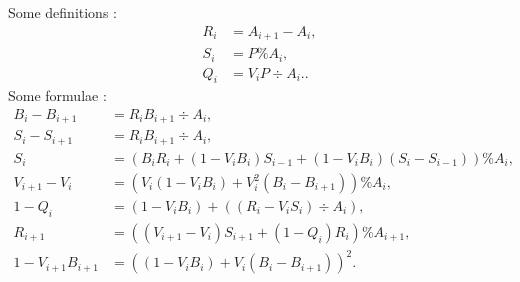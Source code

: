 \documentclass{sig-alternate-2013}
\begin{document}
\begin{lem} \label{lem:formulae}
Some definitions :
\begin{align}
R_i &= A_{i+1} -A_i, \label{eqdef:Ri}\\
S_i &= P \% A_i, \label{eqdef:Si} \\
Q_i &= V_i P \div A_i. \label{eqdef:Qi}. 
\end{align}
Some formulae :
\begin{align}
B_i-B_{i+1} &= R_i B_{i+1} \div A_i, \label{eqdef:Biminus} \\
S_i-S_{i+1} &= R_i B_{i+1} \div A_i,  \label{eqdef:Siminus} \\
S_{i} &= (B_i R_i + (1-V_i B_i) S_{i-1}+(1-V_i B_i)(S_i-S_{i-1})) \% A_{i}, \label{eqdef:Si2}  \\
V_{i+1}-V_i &= (V_i (1-V_i B_i)+V_i^2(B_i-B_{i+1})) \% A_{i}, \label{eqdef:Viminus}\\
1-Q_i &= (1-V_i B_i)+((R_i-V_i S_i) \div A_i), \label{eqdef:Qiminus}\\
R_{i+1} &= ((V_{i+1}-V_i)S_{i+1}+(1-Q_i)R_i) \% A_{i+1}, \label{eq:Riplus}\\
1-V_{i+1}B_{i+1} &= ((1-V_i B_i)+V_i (B_i-B_{i+1}))^2. \label{eq:ViBiplus}
\end{align}
\end{lem}
\end{document}
